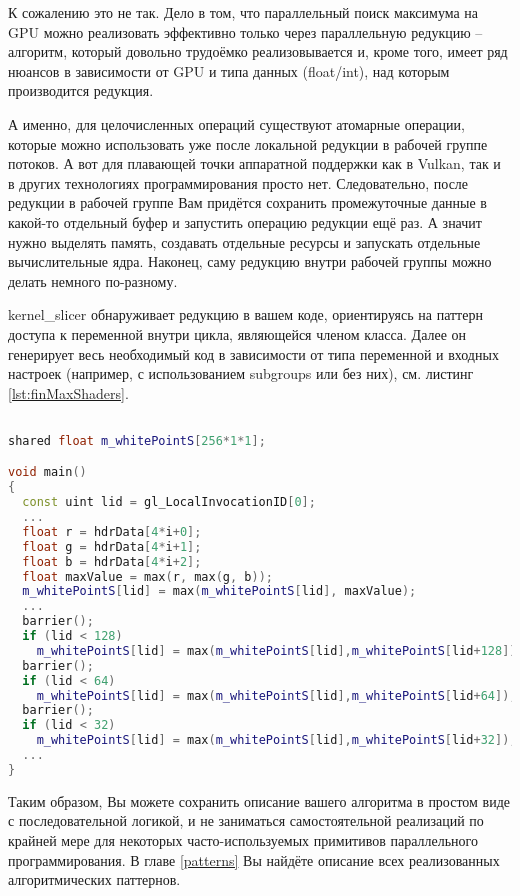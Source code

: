 \documentclass[11pt,fleqn,english,russian]{report} %
\begin{document}
К сожалению это не так. Дело в том, что параллельный поиск максимума на GPU можно реализовать эффективно только через параллельную редукцию -- алгоритм, который довольно трудоёмко реализовывается и, кроме того, имеет ряд нюансов в зависимости от GPU и типа данных (float/int), над которым производится редукция. 

А именно, для целочисленных операций существуют атомарные операции, которые можно использовать уже после локальной редукции в рабочей группе потоков. А вот для плавающей точки аппаратной поддержки как в Vulkan, так и в других технологиях программирования просто нет. Следовательно, после редукции в рабочей группе Вам придётся сохранить промежуточные данные в какой-то отдельный буфер и запустить операцию редукции ещё раз. А значит нужно выделять память, создавать отдельные ресурсы и запускать отдельные вычислительные ядра. Наконец, саму редукцию внутри рабочей группы можно делать немного по-разному.

kernel\_slicer обнаруживает редукцию в вашем коде, ориентируясь на паттерн доступа к переменной внутри цикла, являющейся членом класса. Далее он генерирует весь необходимый код в зависимости от типа переменной и входных настроек (например, с использованием subgroups или без них), см. листинг \ref{lst:finMaxShaders}.

\begin{lstlisting}[language=C++, 
	               caption=Фрагмент сгенерированного GLSL шейдера для параллельной редукции, 
	               label=lst:finMaxShaders]	

shared float m_whitePointS[256*1*1]; 

void main()
{	               
  const uint lid = gl_LocalInvocationID[0];
  ...	               
  float r = hdrData[4*i+0];
  float g = hdrData[4*i+1];
  float b = hdrData[4*i+2];
  float maxValue = max(r, max(g, b));
  m_whitePointS[lid] = max(m_whitePointS[lid], maxValue);
  ...
  barrier();
  if (lid < 128) 
  	m_whitePointS[lid] = max(m_whitePointS[lid],m_whitePointS[lid+128]);
  barrier();
  if (lid < 64) 
  	m_whitePointS[lid] = max(m_whitePointS[lid],m_whitePointS[lid+64]);
  barrier();
  if (lid < 32) 
  	m_whitePointS[lid] = max(m_whitePointS[lid],m_whitePointS[lid+32]);
  ...
}  
\end{lstlisting}

Таким образом, Вы можете сохранить описание вашего алгоритма в простом виде с последовательной логикой, и не заниматься самостоятельной реализаций по крайней мере для некоторых часто-используемых примитивов параллельного программирования. В главе \ref{patterns} Вы найдёте описание всех реализованных алгоритмических паттернов.
\end{document}
